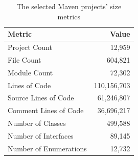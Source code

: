 \documentclass{sig-alternate}
\begin{document}
\begin{table}
\centering
\caption{The selected Maven projects' size metrics}
\label{tbl:oss-size-metrics}
\begin{tabular}{l r}
 \hline
\textbf{Metric} & \textbf{Value}\\
\hline
Project Count & 12,959\\
File Count & 604,821\\
Module Count & 72,302\\
Lines of Code & 110,156,703\\
Source Lines of Code & 61,246,807\\
Comment Lines of Code & 36,696,217\\
Number of Classes & 499,588\\
Number of Interfaces & 89,145\\
Number of Enumerations & 12,732\\
\hline
\end{tabular}
\end{table}
\end{document}

